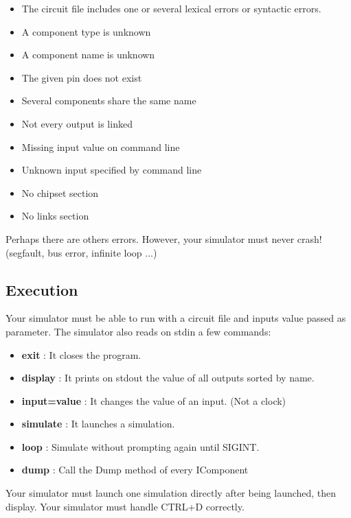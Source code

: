 \documentclass{koala-en}
\begin{document}
  \begin{itemize}
    \item The circuit file includes one or several lexical errors
      or syntactic errors.
    \item A component type is unknown
    \item A component name is unknown
    \item The given pin does not exist
    \item Several components share the same name
    \item Not every output is linked
    \item Missing input value on command line
    \item Unknown input specified by command line
    \item No chipset section
    \item No links section
  \end{itemize}

    Perhaps there are others errors. However, your simulator
   must never crash! (segfault, bus error, infinite loop ...)

   \subsection{Execution}
   
   Your simulator must be able to run with a circuit file and inputs value passed as parameter.
   The simulator also reads on stdin a few commands:
   
   \begin{itemize}
    \item \textbf{exit} : It closes the program.
    \item \textbf{display} : It prints on stdout the value of all outputs sorted by name.
    \item \textbf{input=value} : It changes the value of an input. (Not a clock)
    \item \textbf{simulate} : It launches a simulation.
    \item \textbf{loop} : Simulate without prompting again until SIGINT.
    \item \textbf{dump} : Call the Dump method of every IComponent
  \end{itemize}

  Your simulator must launch one simulation directly after being launched, then display.
  Your simulator must handle CTRL+D correctly.\\
  
\end{document}
